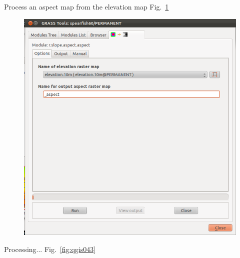 Process an aspect map from the elevation map Fig.~\ref{fig:qgis042}

\begin{figure}[htbp]
   \centering
   \includegraphics[scale=0.25]{qgis042.png}
   \caption{}
   \label{fig:qgis042}
\end{figure}

Processing... Fig.~\ref{fig:qgis043}

